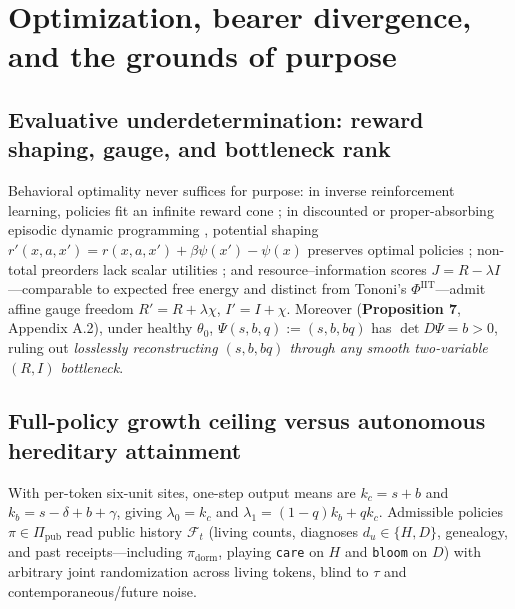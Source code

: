 \documentclass[11pt,letterpaper]{article}
\begin{document}
\section{Optimization, bearer divergence, and the grounds of
purpose}\label{optimization-bearer-divergence-and-the-grounds-of-purpose}

\subsection{Evaluative underdetermination: reward shaping, gauge, and
bottleneck
rank}\label{evaluative-underdetermination-reward-shaping-gauge-and-bottleneck-rank}

Behavioral optimality never suffices for purpose: in inverse
reinforcement learning, policies fit an infinite reward cone
\citep[§3.1]{ngRussell2000}; in discounted or proper-absorbing episodic
dynamic programming \citep{blackwell1965, puterman1994}, potential
shaping \(r'(x,a,x') = r(x,a,x') + \beta\psi(x') - \psi(x)\) preserves
optimal policies \citep{ngHaradaRussell1999}; non-total preorders lack
scalar utilities \citep{krantz1971}; and resource--information scores
\(J = R - \lambda I\)---comparable to expected free energy
\citep{parrPezzuloFriston2022} and distinct from Tononi's
\citeyearpar{tononi2004} \(\Phi^{\mathrm{IIT}}\)---admit affine gauge
freedom \(R' = R + \lambda\chi\), \(I' = I + \chi\). Moreover
(\textbf{Proposition 7}, Appendix A.2), under healthy \(\theta_0\),
\(\Psi(s,b,q) := (s, b, bq)\) has \(\det D\Psi = b > 0\), ruling out
\emph{losslessly reconstructing \((s,b,bq)\) through any smooth
two-variable \((R,I)\) bottleneck}.

\subsection{Full-policy growth ceiling versus autonomous hereditary
attainment}\label{full-policy-growth-ceiling-versus-autonomous-hereditary-attainment}

With per-token six-unit sites, one-step output means are \(k_c = s+b\)
and \(k_b = s-\delta+b+\gamma\), giving \(\lambda_0 = k_c\) and
\(\lambda_1 = (1-q)k_b + q k_c\). Admissible policies
\(\pi \in \Pi_{\mathrm{pub}}\) read public history \(\mathcal{F}_t\)
(living counts, diagnoses \(d_u \in \{H, D\}\), genealogy, and past
receipts---including \(\pi_{\mathrm{dorm}}\), playing \texttt{care} on
\(H\) and \texttt{bloom} on \(D\)) with arbitrary joint randomization
across living tokens, blind to \(\tau\) and contemporaneous/future
noise.
\end{document}
